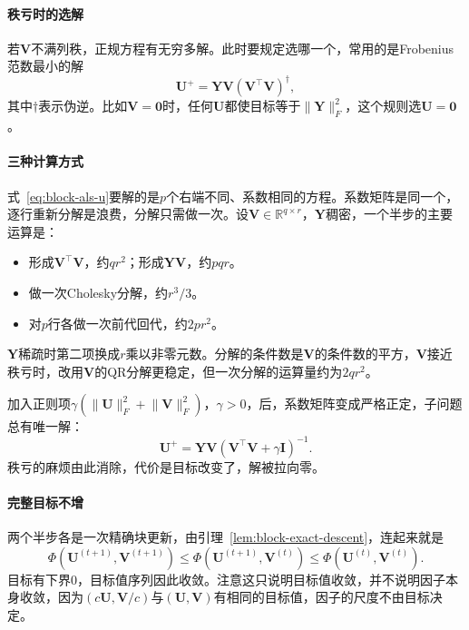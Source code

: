 \paragraph{秩亏时的选解}
若$\bm{V}$不满列秩，正规方程有无穷多解。此时要规定选哪一个，常用的是Frobenius范数最小的解
\[
 \bm{U}^{+}=\bm{Y}\bm{V}(\bm{V}^\top\bm{V})^{\dagger},
\]
其中$\dagger$表示伪逆。比如$\bm{V}=\bm{0}$时，任何$\bm{U}$都使目标等于$\lVert\bm{Y}\rVert_F^2$，这个规则选$\bm{U}=\bm{0}$。

\paragraph{三种计算方式}
式~\eqref{eq:block-als-u}要解的是$p$个右端不同、系数相同的方程。系数矩阵是同一个，逐行重新分解是浪费，分解只需做一次。设$\bm{V}\in\mathbb{R}^{q\times r}$，$\bm{Y}$稠密，一个半步的主要运算是：
\begin{itemize}
 \item 形成$\bm{V}^\top\bm{V}$，约$qr^2$；形成$\bm{Y}\bm{V}$，约$pqr$。
 \item 做一次Cholesky分解，约$r^3/3$。
 \item 对$p$行各做一次前代回代，约$2pr^2$。
\end{itemize}
$\bm{Y}$稀疏时第二项换成$r$乘以非零元数。分解的条件数是$\bm{V}$的条件数的平方，$\bm{V}$接近秩亏时，改用$\bm{V}$的QR分解更稳定，但一次分解的运算量约为$2qr^2$。

加入正则项$\gamma(\lVert\bm{U}\rVert_F^2+\lVert\bm{V}\rVert_F^2)$，$\gamma>0$，后，系数矩阵变成严格正定，子问题总有唯一解：
\begin{equation}
 \bm{U}^{+}=\bm{Y}\bm{V}(\bm{V}^\top\bm{V}+\gamma\bm{I})^{-1}.
 \label{eq:block-als-ridge}
\end{equation}
秩亏的麻烦由此消除，代价是目标改变了，解被拉向零。

\paragraph{完整目标不增}
两个半步各是一次精确块更新，由引理~\ref{lem:block-exact-descent}，连起来就是
\begin{equation}
 \Phi(\bm{U}^{(t+1)},\bm{V}^{(t+1)})\leq\Phi(\bm{U}^{(t+1)},\bm{V}^{(t)})\leq\Phi(\bm{U}^{(t)},\bm{V}^{(t)}).
 \label{eq:block-als-monotone}
\end{equation}
目标有下界$0$，目标值序列因此收敛。注意这只说明目标值收敛，并不说明因子本身收敛，因为$(c\bm{U},\bm{V}/c)$与$(\bm{U},\bm{V})$有相同的目标值，因子的尺度不由目标决定。

